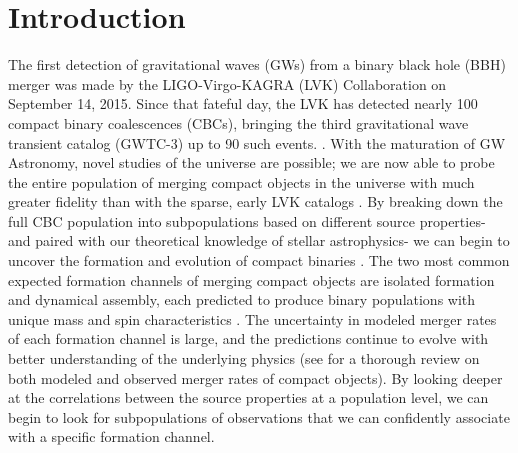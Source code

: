 \section{Introduction} \label{sec:intro}

The first detection of gravitational waves (GWs) from a binary black hole (BBH) merger was made by the LIGO-Virgo-KAGRA (LVK) Collaboration on September 14, 2015. Since that fateful day, the LVK has detected nearly 100 compact binary coalescences (CBCs), bringing the third gravitational wave transient catalog (GWTC-3) up to 90 such events. \citep{2015CQGra..32g4001L,2015CQGra..32b4001A,2021PTEP.2021eA102A,2016PhRvL.116f1102A,2019PhRvX...9c1040A,2021PhRvX..11b1053A,2021arXiv211103606T}. With the maturation of GW Astronomy, novel studies of the universe are possible; we are now able to probe the entire population of merging compact objects in the universe with much greater fidelity than with the sparse, early LVK catalogs \citep{2019ApJ...882L..24A,2021ApJ...913L...7A,2021arXiv211103634T}. By breaking down the full CBC population into subpopulations based on different source properties- and paired with our theoretical knowledge of stellar astrophysics- we can begin to uncover the formation and evolution of compact binaries \citep{2017ApJ...846...82Z}. The two most common expected formation channels of merging compact objects are isolated formation and dynamical assembly, each predicted to produce binary populations with unique mass and spin characteristics \citep{2017Natur.548..426F,2018ApJ...854L...9F,10.3847/1538-4357/ab88b2}. The uncertainty in modeled merger rates of each formation channel is large, and the predictions continue to evolve with better understanding of the underlying physics (see \citet{10.1007/s41114-021-00034-3} for a thorough review on both modeled and observed merger rates of compact objects). By looking deeper at the correlations between the source properties at a population level, we can begin to look for subpopulations of observations that we can confidently associate with a specific formation channel.

